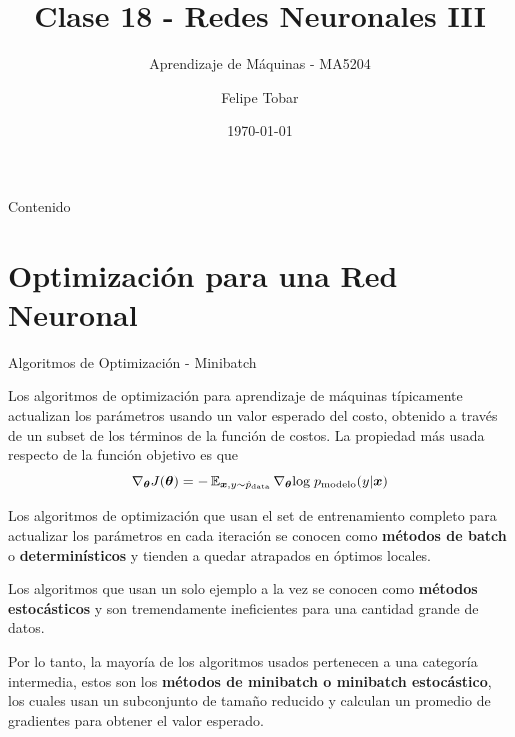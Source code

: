 \documentclass[9pt]{beamer}
\title{Clase 18 - Redes Neuronales III}
\subtitle{Aprendizaje de Máquinas - MA5204}
\date{\today}
\author{Felipe Tobar}
\institute{Department of Mathematical Engineering \&\\ Center for Mathematical Modelling\\Universidad de Chile}
\begin{document}
\begin{frame}
  \titlepage
\end{frame}
\begin{frame}{Contenido}
  \tableofcontents
  
\end{frame}

\section{Optimización para una Red Neuronal}
\begin{frame}{Algoritmos de Optimización - Minibatch}

Los algoritmos de optimización para aprendizaje de máquinas típicamente actualizan los parámetros usando un valor esperado del costo, obtenido a través de un subset de los términos de la función de costos. La propiedad más usada respecto de la función objetivo es que \pause
\begin{equation*}
\nabla_{\bm{\theta}}J(\bm{\theta}) = -\operatorname{\mathbb{E}}_{\bm{x},y\sim \hat{p}_{\textrm{data}}}\nabla_{\bm{\theta}}\textrm{log}\; p_{\textrm{modelo}}(y|\bm{x})
\end{equation*} \pause

Los algoritmos de optimización que usan el set de entrenamiento completo para actualizar los parámetros en cada iteración se conocen como \textbf{métodos de batch} o \textbf{determinísticos} y tienden a quedar atrapados en óptimos locales. \\ \pause 

Los algoritmos que usan un solo ejemplo a la vez se conocen como \textbf{métodos estocásticos} y son tremendamente ineficientes para una cantidad grande de datos. \pause 

Por lo tanto, la mayoría de los algoritmos usados pertenecen a una categoría intermedia, estos son los \textbf{métodos de minibatch o minibatch estocástico}, los cuales usan un subconjunto de tamaño reducido y calculan un promedio de gradientes para obtener el valor esperado.


\end{frame}
\end{document}
